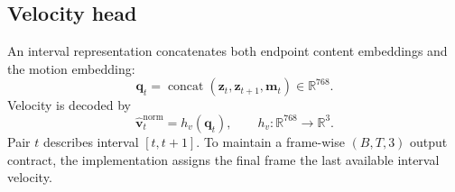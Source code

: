 \documentclass[11pt,a4paper]{article}
\newcommand{\R}{\mathbb{R}}\newcommand{\norm}[1]{\left\lVert #1\right\rVert}\newcommand{\E}{\mathbb{E}}\newcommand{\dt}{\Delta t}
\begin{document}
\subsection{Velocity head}
An interval representation concatenates both endpoint content embeddings and the motion embedding:
\begin{equation}
\bm q_t=\operatorname{concat}(\bm z_t,\bm z_{t+1},\bm m_t)\in\R^{768}.
\end{equation}
Velocity is decoded by
\begin{equation}
\widehat{\bm v}^{\mathrm{norm}}_t=h_v(\bm q_t),\qquad h_v:\R^{768}\to\R^3.
\end{equation}
Pair $t$ describes interval $[t,t+1]$. To maintain a frame-wise $(B,T,3)$ output contract, the implementation assigns the final frame the last available interval velocity.
\end{document}
